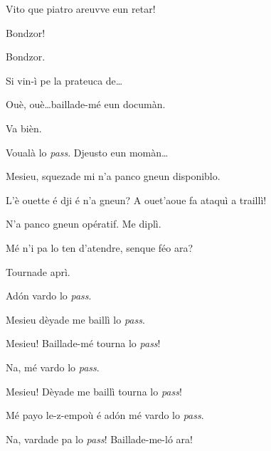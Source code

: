 \begin{drama}

\Sandrinospeaks Vito que piatro areuvve eun retar!



\Genespeaks {} Bondzor!

\Sandrinospeaks Bondzor.

\Genespeaks Si vin-ì pe la prateuca de\ldots

\Sandrinospeaks  Ouè, ouè\ldots baillade-mé eun documàn.

\Genespeaks Va bièn.


\Sandrinospeaks Voualà lo \textit{pass}. Djeusto eun momàn\ldots


\Sandrinospeaks{} Mesieu, squezade mi n’a panco gneun disponiblo.

\Genespeaks L'è ouette é dji é n'a gneun? A ouet'aoue fa ataquì a traillì!

\Sandrinospeaks N'a panco gneun opératif. Me diplì.

\Genespeaks{} Mé n'i pa lo ten d'atendre, senque féo ara?

\Sandrinospeaks Tournade aprì.

\Genespeaks Ad\'on vardo lo \textit{pass}.

\Sandrinospeaks Mesieu dèyade me baillì lo \textit{pass}. 


\Sandrinospeaks{} Mesieu! Baillade-mé tourna lo \textit{pass}!

\Genespeaks Na, mé vardo lo \textit{pass}.

\Sandrinospeaks{} Mesieu! Dèyade me baillì tourna lo \textit{pass}!

\Genespeaks Mé payo le-z-empoù é ad\'on mé vardo lo \textit{pass}.

\Sandrinospeaks{} Na, vardade pa lo \textit{pass}! Baillade-me-l\'o ara! 


\end{drama}

